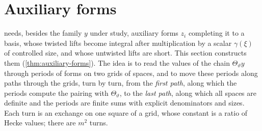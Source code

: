 \section{Auxiliary forms}\label{sec:auxiliary}

 needs, besides the family $y$ under study, auxiliary forms $z_i$ completing it to a basis, whose twisted lifts become integral
after multiplication by a scalar $\gamma(\xi)$ of controlled size, and whose untwisted lifts are short. This section constructs them (\cref{thm:auxiliary-forms}).
The idea is to read the values of the chain $\Theta_\vartheta y$ through periods of forms on two grids of spaces, and to move these periods along paths through the
grids, turn by turn, from the \emph{first path}, along which the periods compute the pairing with $\Theta_\vartheta$, to the \emph{last path}, along which all spaces
are definite and the periods are finite sums with explicit denominators and sizes. Each turn is an exchange on one square of a grid, whose constant is a ratio of
Hecke values; there are $m^2$ turns.


